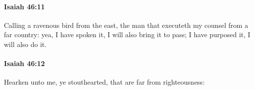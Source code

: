 		\paragraph{Isaiah 46:11} %
			\label{ISAIAH-46-11}

			Calling a ravenous bird from the east, the man that executeth my counsel from a far country: yea, I have spoken it, I will also bring it to pass; I have purposed it, I will also do it.


		\paragraph{Isaiah 46:12} %
			\label{ISAIAH-46-12}

			Hearken unto me, ye stouthearted, that are far from righteousness:


